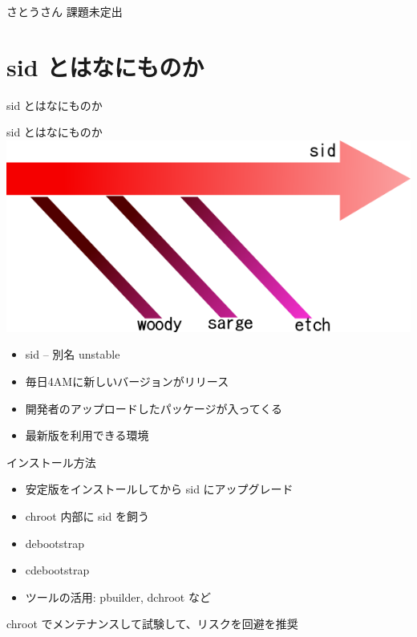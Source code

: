 \documentclass[cjk,dvipdfmx]{beamer}
\begin{document}
\begin{frame}{さとうさん}
課題未定出
\end{frame}

\section{sid とはなにものか}

\begin{frame}
\begin{center}
{\Huge sid とはなにものか}
\end{center}
\end{frame}

\begin{frame}{sid とはなにものか}
\includegraphics[width=0.8\hsize]{image200611/releases.png}
\begin{itemize}
 \item sid -- 別名 unstable 
 \item 毎日4AMに新しいバージョンがリリース
 \item 開発者のアップロードしたパッケージが入ってくる
 \item 最新版を利用できる環境
\end{itemize}
\end{frame}

\begin{frame}{インストール方法}
\begin{minipage}[t]{0.5\hsize}
  \begin{itemize}
  \item 安定版をインストールしてから sid にアップグレード
  \item chroot 内部に sid を飼う
 \end{itemize}
\end{minipage}
\begin{minipage}[t]{0.4\hsize}
 \begin{itemize}
  \item debootstrap
  \item cdebootstrap
  \item ツールの活用: pbuilder, dchroot など
 \end{itemize}
\end{minipage}

\vfill{}
chroot でメンテナンスして試験して、リスクを回避を推奨
\end{frame}
\end{document}
